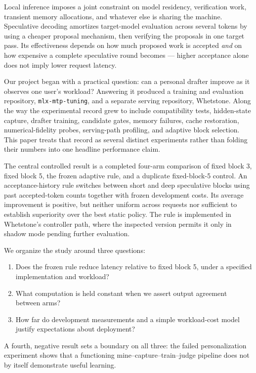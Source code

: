 \documentclass[
  11pt,
]{article}
\providecommand{\tightlist}{%
  \setlength{\itemsep}{0pt}\setlength{\parskip}{0pt}}
\begin{document}
Local inference imposes a joint constraint on model residency,
verification work, transient memory allocations, and whatever else is
sharing the machine. Speculative decoding amortizes target-model
evaluation across several tokens by using a cheaper proposal mechanism,
then verifying the proposals in one target pass. Its effectiveness
depends on how much proposed work is accepted \emph{and} on how
expensive a complete speculative round becomes --- higher acceptance
alone does not imply lower request latency.

Our project began with a practical question: can a personal drafter
improve as it observes one user's workload? Answering it produced a
training and evaluation repository, \texttt{mlx-mtp-tuning}, and a
separate serving repository, Whetstone. Along the way the experimental
record grew to include compatibility tests, hidden-state capture,
drafter training, candidate gates, memory failures, cache restoration,
numerical-fidelity probes, serving-path profiling, and adaptive block
selection. This paper treats that record as several distinct experiments
rather than folding their numbers into one headline performance claim.

The central controlled result is a completed four-arm comparison of
fixed block 3, fixed block 5, the frozen adaptive rule, and a duplicate
fixed-block-5 control. An acceptance-history rule switches between short
and deep speculative blocks using past accepted-token counts together
with frozen development costs. Its average improvement is positive, but
neither uniform across requests nor sufficient to establish superiority
over the best static policy. The rule is implemented in Whetstone's
controller path, where the inspected version permits it only in shadow
mode pending further evaluation.

We organize the study around three questions:

\begin{enumerate}
\def\labelenumi{\arabic{enumi}.}
\tightlist
\item
  Does the frozen rule reduce latency relative to fixed block 5, under a
  specified implementation and workload?
\item
  What computation is held constant when we assert output agreement
  between arms?
\item
  How far do development measurements and a simple workload-cost model
  justify expectations about deployment?
\end{enumerate}

A fourth, negative result sets a boundary on all three: the failed
personalization experiment shows that a functioning
mine--capture--train--judge pipeline does not by itself demonstrate
useful learning.
\end{document}
